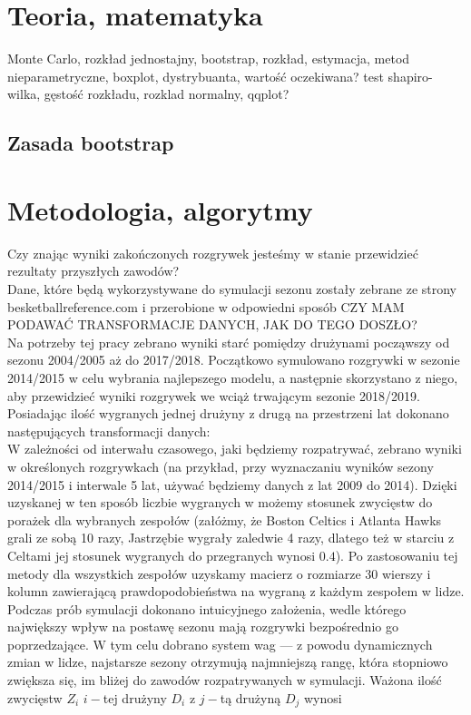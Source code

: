 \documentclass[inzynierska]{pwr_wmat_praca_dyplomowa}
\theoremstyle{plain}
\numberwithin{theorem}{chapter}
\theoremstyle{definition}
\numberwithin{theorem}{chapter}
\begin{document}
\chapter{Teoria, matematyka}
Monte Carlo, rozkład jednostajny, bootstrap, rozkład, estymacja, metod nieparametryczne, boxplot, dystrybuanta, wartość oczekiwana?
test shapiro-wilka, gęstość rozkładu, rozklad normalny, qqplot?

\section{Zasada bootstrap}


\chapter{Metodologia, algorytmy}
Czy znając wyniki zakończonych rozgrywek jesteśmy w stanie przewidzieć rezultaty przyszłych zawodów?
\\
Dane, które będą wykorzystywane do symulacji sezonu zostały zebrane ze strony besketballreference.com i przerobione w odpowiedni sposób CZY MAM PODAWAĆ TRANSFORMACJE DANYCH, JAK DO TEGO DOSZŁO?
\\
Na potrzeby tej pracy zebrano wyniki starć pomiędzy drużynami począwszy od sezonu 2004/2005 aż do 2017/2018. Początkowo symulowano rozgrywki w sezonie 2014/2015 w celu wybrania najlepszego modelu, a następnie skorzystano z niego, aby przewidzieć wyniki rozgrywek we wciąż trwającym sezonie 2018/2019.
Posiadając ilość wygranych jednej drużyny z drugą na przestrzeni lat dokonano następujących transformacji danych:
\\
W zależności od interwału czasowego, jaki będziemy rozpatrywać, zebrano wyniki w określonych rozgrywkach (na przykład, przy wyznaczaniu wyników sezony 2014/2015 i interwale 5 lat, używać będziemy danych z lat 2009 do 2014). Dzięki uzyskanej w ten sposób liczbie wygranych w możemy stosunek zwycięstw do porażek dla wybranych zespołów (załóżmy, że Boston Celtics i Atlanta Hawks grali ze sobą 10 razy, Jastrzębie wygrały zaledwie 4 razy, dlatego też w starciu z Celtami jej stosunek wygranych do przegranych wynosi $0.4$). Po zastosowaniu tej metody dla wszystkich zespołów uzyskamy macierz o rozmiarze 30 wierszy i kolumn zawierającą prawdopodobieństwa na wygraną z każdym zespołem w lidze.
\\
Podczas prób symulacji dokonano intuicyjnego założenia, wedle którego największy wpływ na postawę sezonu mają rozgrywki bezpośrednio go poprzedzające. W tym celu dobrano system wag --- z powodu dynamicznych zmian w lidze, najstarsze sezony otrzymują najmniejszą rangę, która stopniowo zwiększa się, im bliżej do zawodów rozpatrywanych w symulacji. Ważona ilość zwycięstw $Z_i$ $i-$tej drużyny $D_i$ z $j-$tą drużyną $D_j$ wynosi
\end{document}
